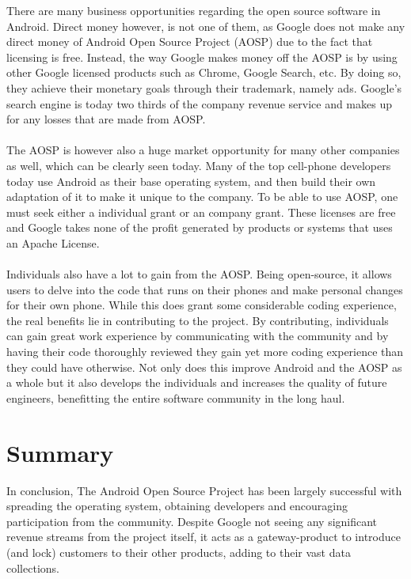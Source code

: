 \documentclass[conference]{IEEEtran}
\begin{document}
There are many business opportunities regarding the open source software in Android. Direct money however, is not one of them, as Google does not make any direct money of Android Open Source Project (AOSP) due to the fact that licensing is free.\cite{Money} Instead, the way Google makes money off the AOSP is by using other Google licensed products such as Chrome, Google Search, etc. By doing so, they achieve their monetary goals through their trademark, namely ads. Google's search engine is today two thirds of the company revenue service and makes up for any losses that are made from AOSP.\cite{requires citation!} \\
\\
The AOSP is however also a huge market opportunity for many other companies as well, which can be clearly seen today. Many of the top cell-phone developers today use Android as their base operating system, and then build their own adaptation of it to make it unique to the company. To be able to use AOSP, one must seek either a individual grant or an company grant.\cite{android-licenses} These licenses are free and Google takes none of the profit generated by products or systems that uses an Apache License.\\
\\
Individuals also have a lot to gain from the AOSP. Being open-source, it allows users to delve into the code that runs on their phones and make personal changes for their own phone. While this does grant some considerable coding experience, the real benefits lie in contributing to the project. By contributing, individuals can gain great work experience by communicating with the community and by having their code thoroughly reviewed they gain yet more coding experience than they could have otherwise. Not only does this improve Android and the AOSP as a whole but it also develops the individuals and increases the quality of future engineers, benefitting the entire software community in the long haul. 


\section{Summary}
\label{summary}

In conclusion, The Android Open Source Project has been largely successful with spreading the operating system, obtaining developers and encouraging participation from the community. Despite Google not seeing any significant revenue streams from the project itself, it acts as a gateway-product to introduce (and lock) customers to their other products, adding to their vast data collections.
\end{document}
